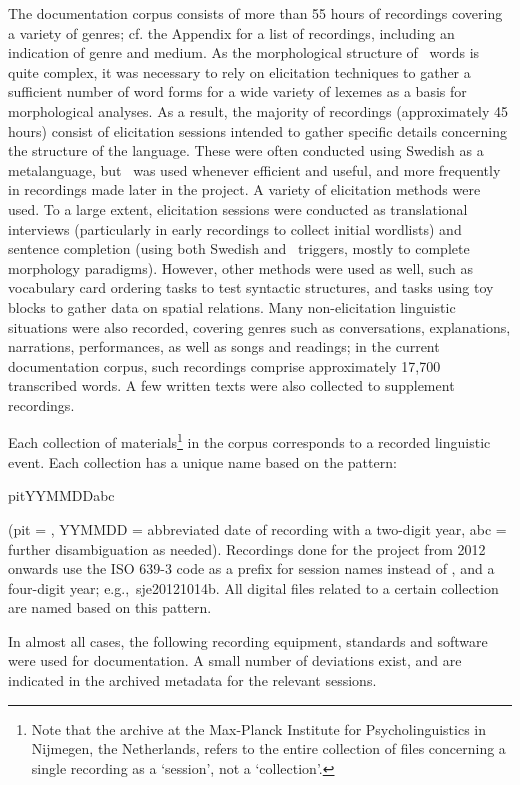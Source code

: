The documentation corpus consists of more than 55 hours of recordings covering a variety of genres; cf. the Appendix for a list of recordings, including an indication of genre and medium. 
As the morphological structure of \PS\ words is quite complex, %
it was necessary to rely on elicitation techniques to gather a sufficient number of word forms for a wide variety of lexemes as a basis for morphological analyses. 
As a result, the majority of recordings (approximately 45 hours) consist of elicitation sessions intended to gather specific details concerning the structure of the language. 
These were often conducted using Swedish as a metalanguage, but \PS\ was used whenever efficient and useful, and more frequently in recordings made later in the project. 
A variety of elicitation methods were used. To a large extent, elicitation sessions were conducted as translational interviews (particularly in early recordings to collect initial wordlists) and sentence completion (using both Swedish and \PS\ triggers, mostly to complete morphology paradigms). However, other methods were used as well, such as vocabulary card ordering tasks to test syntactic structures, and tasks using toy blocks to gather data on spatial relations. 
Many non-elicitation linguistic situations were also recorded, covering genres such as conversations, explanations, narrations, performances, as well as songs and readings; in the current documentation corpus, such recordings comprise approximately 17,700 transcribed words. A few written texts were also collected to supplement recordings. 

Each collection of materials\footnote{Note that the archive at the Max-Planck Institute for Psycholinguistics in Nijmegen, the Netherlands, refers to the entire collection of files concerning a single recording as a ‘session’, not a ‘collection’.} 
in the corpus corresponds to a recorded linguistic event. Each collection has a unique name based on the pattern:
\begin{center} pitYYMMDDabc \end{center}
(pit = \PS, YYMMDD = abbreviated date of recording with a two-digit year, abc = further disambiguation as needed). Recordings done for the project from 2012 onwards use the ISO 639-3 code  as a prefix for session names instead of , and a four-digit year; e.g.,~{sje2012}1014b. 
All digital files related to a certain collection are named based on this pattern. 

In almost all cases, the following recording equipment, standards and software were used for documentation. A small number of deviations exist, and are indicated in the archived metadata for the relevant sessions. 
 
